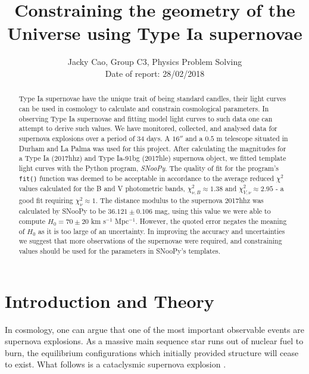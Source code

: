 \documentclass[twocolumn]{revtex4}
\begin{document}
\textheight=26.385cm

\title{Constraining the geometry of the Universe using Type Ia supernovae}
 
\author{Jacky Cao, Group C3, Physics Problem Solving \\ Date of report: 28/02/2018}

\begin{abstract}              
Type Ia supernovae have the unique trait of being standard candles, their light curves can be used in cosmology to calculate and constrain cosmological parameters. In observing Type Ia supernovae and fitting model light curves to such data one can attempt to derive such values. We have monitored, collected, and analysed data for supernova explosions over a period of 34 days. A $16''$ and a $0.5$ m telescope situated in Durham and La Palma was used for this project. After calculating the magnitudes for a Type Ia (2017hhz) and Type Ia-91bg (2017hle) supernova object, we fitted template light curves with the Python program, \textit{SNooPy}. The quality of fit for the program's \texttt{fit()} function was deemed to be acceptable in accordance to the average reduced $\chi^2$ values calculated for the B and V photometric bands, $\chi^2_{\nu,B} \approx 1.38$ and $\chi^2_{V,\nu} \approx 2.95$ - a good fit requiring $\chi^2_{\nu} \approx1$. The distance modulus to the supernova 2017hhz was calculated by SNooPy to be $36.121\pm0.106$ mag, using this value we were able to compute $H_0=70\pm20$ km s$^{-1}$ Mpc$^{-1}$. However, the quoted error negates the meaning of $H_0$ as it is too large of an uncertainty. In improving the accuracy and uncertainties we suggest that more observations of the supernovae were required, and constraining values should be used for the parameters in SNooPy's templates.
\end{abstract}

\maketitle

\vspace{-3ex}
\section{Introduction and Theory} 
\vspace{-2ex}
In cosmology, one can argue that one of the most important observable events are supernova explosions. As a massive main sequence star runs out of nuclear fuel to burn, the equilibrium configurations which initially provided structure will cease to exist. What follows is a cataclysmic supernova explosion \cite{longair}. 
\end{document}
